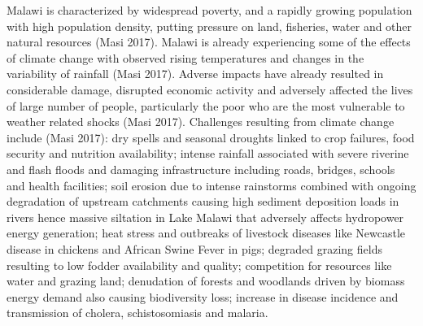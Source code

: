 \documentclass[
]{book}
\begin{document}
Malawi is characterized by widespread poverty, and a rapidly growing population with high population density, putting pressure on land, fisheries, water and other
natural resources (Masi 2017). Malawi is already experiencing some of the effects of climate change with observed rising temperatures and changes in the variability
of rainfall (Masi 2017). Adverse impacts have already resulted in considerable damage, disrupted economic activity and adversely affected the lives of large number
of people, particularly the poor who are the most vulnerable to weather related shocks (Masi 2017). Challenges resulting from climate change include (Masi 2017):
dry spells and seasonal droughts linked to crop failures, food security and nutrition availability; intense rainfall associated with severe riverine and flash
floods and damaging infrastructure including roads, bridges, schools and health facilities; soil erosion due to intense rainstorms combined with ongoing degradation
of upstream catchments causing high sediment deposition loads in rivers hence massive siltation in Lake Malawi that adversely affects hydropower energy generation;
heat stress and outbreaks of livestock diseases like Newcastle disease in chickens and African Swine Fever in pigs; degraded grazing fields resulting to low fodder
availability and quality; competition for resources like water and grazing land; denudation of forests and woodlands driven by biomass energy demand also causing
biodiversity loss; increase in disease incidence and transmission of cholera, schistosomiasis and malaria.
\end{document}
